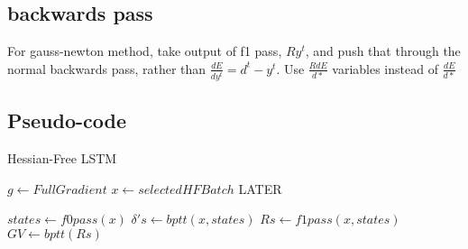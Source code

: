 \documentclass{article}
\begin{document}
\subsection{backwards pass}
For gauss-newton method, take output of f1 pass, $Ry^t$, and push that through the normal backwards pass, rather than $\frac{dE}{dy^t} = d^t - y^t$. Use $\frac{RdE}{d*}$ variables instead of $\frac{dE}{d*}$ 

\subsection{Pseudo-code}

\begin{algorithm}
\caption{Hessian-Free LSTM}
\begin{algorithmic}[0]
\State $g\gets Full Gradient$
\State $x \gets selected HF Batch$
\State LATER
\EndProcedure

\EndFor\label{}

\State $states\gets f0pass(x)$
\State $\delta 's\gets bptt(x, states)$
\State $Rs \gets f1pass(x, states)$
\State $GV \gets bptt(Rs)$
\EndProcedure

\EndProcedure

\end{algorithmic}
\end{algorithm}
\end{document}
